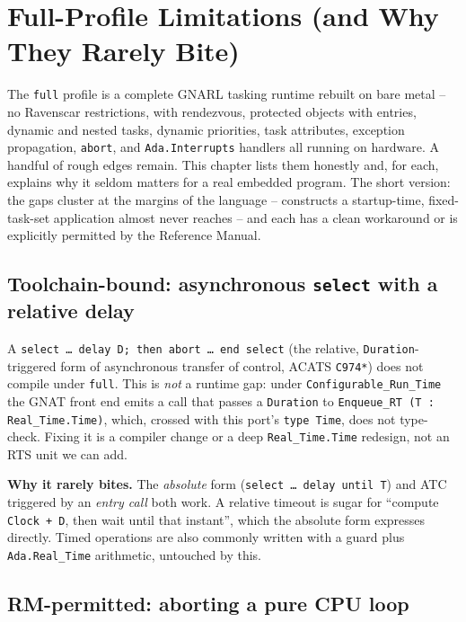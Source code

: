 \chapter{Full-Profile Limitations (and Why They Rarely Bite)}

The \texttt{full} profile is a complete GNARL tasking runtime rebuilt on bare
metal -- no Ravenscar restrictions, with rendezvous, protected objects with
entries, dynamic and nested tasks, dynamic priorities, task attributes,
exception propagation, \texttt{abort}, and \texttt{Ada.Interrupts} handlers all
running on hardware. A handful of rough edges remain. This chapter lists them
honestly and, for each, explains why it seldom matters for a real embedded
program. The short version: the gaps cluster at the margins of the language --
constructs a startup-time, fixed-task-set application almost never reaches -- and
each has a clean workaround or is explicitly permitted by the Reference Manual.

\section{Toolchain-bound: asynchronous \texttt{select} with a relative delay}

A \texttt{select \ldots\ delay D; then abort \ldots\ end select} (the relative,
\texttt{Duration}-triggered form of asynchronous transfer of control, ACATS
\texttt{C974*}) does not compile under \texttt{full}. This is \emph{not} a runtime
gap: under \texttt{Configurable\_Run\_Time} the GNAT front end emits a call that
passes a \texttt{Duration} to \texttt{Enqueue\_RT (T : Real\_Time.Time)}, which,
crossed with this port's \texttt{type Time}, does not type-check. Fixing it is a
compiler change or a deep \texttt{Real\_Time.Time} redesign, not an RTS unit we
can add.

\textbf{Why it rarely bites.} The \emph{absolute} form (\texttt{select \ldots\
delay until T}) and ATC triggered by an \emph{entry call} both work. A relative
timeout is sugar for ``compute \texttt{Clock + D}, then wait until that instant'',
which the absolute form expresses directly. Timed operations are also commonly
written with a guard plus \texttt{Ada.Real\_Time} arithmetic, untouched by this.

\section{RM-permitted: aborting a pure CPU loop}

